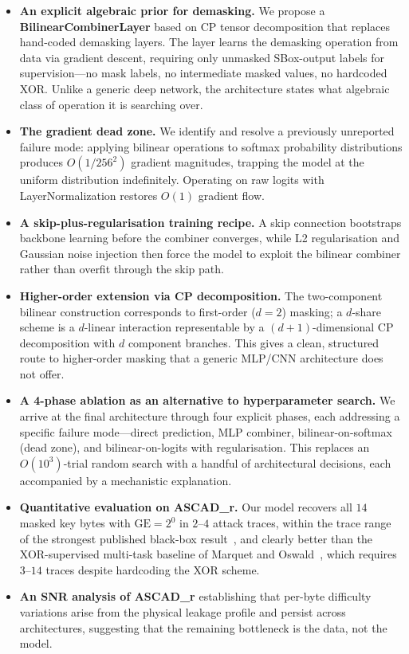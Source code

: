 \documentclass[runningheads]{llncs}
\newcommand{\GE}{\mathrm{GE}}
\begin{document}
\begin{itemize}[leftmargin=*]
  \item \textbf{An explicit algebraic prior for demasking.}
  We propose a \textbf{BilinearCombinerLayer} based on CP tensor decomposition that replaces hand-coded demasking layers.
  The layer learns the demasking operation from data via gradient descent, requiring only unmasked SBox-output labels for supervision---no mask labels, no intermediate masked values, no hardcoded XOR.
  Unlike a generic deep network, the architecture states what algebraic class of operation it is searching over.

  \item \textbf{The gradient dead zone.}
  We identify and resolve a previously unreported failure mode: applying bilinear operations to softmax probability distributions produces $O(1/256^2)$ gradient magnitudes, trapping the model at the uniform distribution indefinitely.
  Operating on raw logits with LayerNormalization restores $O(1)$ gradient flow.

  \item \textbf{A skip-plus-regularisation training recipe.}
  A skip connection bootstraps backbone learning before the combiner converges, while L2 regularisation and Gaussian noise injection then force the model to exploit the bilinear combiner rather than overfit through the skip path.

  \item \textbf{Higher-order extension via CP decomposition.}
  The two-component bilinear construction corresponds to first-order ($d{=}2$) masking; a $d$-share scheme is a $d$-linear interaction representable by a $(d{+}1)$-dimensional CP decomposition with $d$ component branches.
  This gives a clean, structured route to higher-order masking that a generic MLP/CNN architecture does not offer.

  \item \textbf{A 4-phase ablation as an alternative to hyperparameter search.}
  We arrive at the final architecture through four explicit phases, each addressing a specific failure mode---direct prediction, MLP combiner, bilinear-on-softmax (dead zone), and bilinear-on-logits with regularisation.
  This replaces an $O(10^3)$-trial random search with a handful of architectural decisions, each accompanied by a mechanistic explanation.

  \item \textbf{Quantitative evaluation on ASCAD\_r.}
  Our model recovers all $14$ masked key bytes with $\GE = 2^{0}$ in $2$--$4$ attack traces, within the trace range of the strongest published black-box result~\cite{perin2022exploring}, and clearly better than the XOR-supervised multi-task baseline of Marquet and Oswald~\cite{marquet2024exploring}, which requires $3$--$14$ traces despite hardcoding the XOR scheme.

  \item \textbf{An SNR analysis of ASCAD\_r} establishing that per-byte difficulty variations arise from the physical leakage profile and persist across architectures, suggesting that the remaining bottleneck is the data, not the model.
\end{itemize}
\end{document}
